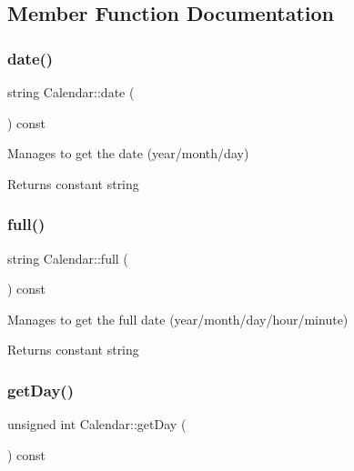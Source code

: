 \subsection{Member Function Documentation}
\mbox{\label{class_calendar_a00249de42fc112c379f4bf139e77dd54}} 
\subsubsection{\texorpdfstring{date()}{date()}}
{\footnotesize\ttfamily string Calendar\+::date (\begin{DoxyParamCaption}{ }\end{DoxyParamCaption}) const}



Manages to get the date (year/month/day) 

\begin{DoxyReturn}{Returns}
constant string 
\end{DoxyReturn}
\mbox{\label{class_calendar_a05c05a05e460dd25ce4a5bf1b8ae0ed8}} 
\subsubsection{\texorpdfstring{full()}{full()}}
{\footnotesize\ttfamily string Calendar\+::full (\begin{DoxyParamCaption}{ }\end{DoxyParamCaption}) const}



Manages to get the full date (year/month/day/hour/minute) 

\begin{DoxyReturn}{Returns}
constant string 
\end{DoxyReturn}
\mbox{\label{class_calendar_aeb7e684bf63d0f500bd243d901dc20a8}} 
\subsubsection{\texorpdfstring{get\+Day()}{getDay()}}
{\footnotesize\ttfamily unsigned int Calendar\+::get\+Day (\begin{DoxyParamCaption}{ }\end{DoxyParamCaption}) const}



